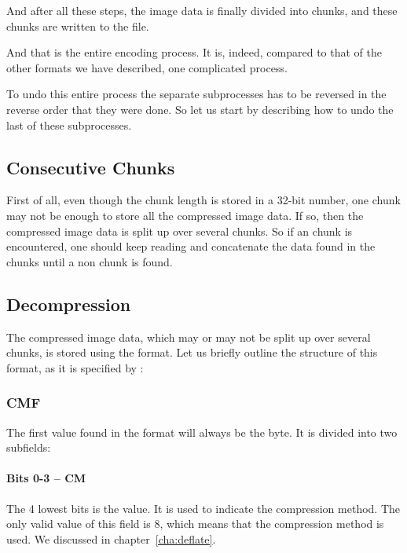 And after all these steps, the image data is finally divided into
\idat chunks, and these chunks are written to the file.

And that is the entire encoding process. It is, indeed, compared to
that of the other formats we have described, one complicated process.

To undo this entire process the separate subprocesses has to be
reversed in the reverse order that they were done. So let us start by
describing how to undo the last of these subprocesses.

\subsection{Consecutive Chunks}

First of all, even though the chunk length is stored in a 32-bit
number, one chunk may not be enough to store all the compressed image
data. If so, then the compressed image data is split up over several
\idat chunks. So if an \idat chunk is encountered, one should keep
reading and concatenate the data found in the \idat chunks until a non
\idat chunk is found.

\subsection{Decompression}
\label{sec:png-dec}

The compressed image data, which may or may not be split up over
several \idat chunks, is stored using the \zlib format. Let us briefly
outline the structure of this format, as it is specified by
\cite{gailly96:_zlib_compr_data_format_specif}:

\subsubsection{CMF}

The first value found in the \zlib format will always be the \cmf
byte. It is divided into two subfields:

\paragraph{Bits 0-3 -- CM}

The 4 lowest bits is the \cm value. It is used to indicate the
compression method. The only valid value of this field is $8$, which
means that the compression method  is used. We discussed
 in chapter~\ref{cha:deflate}.

